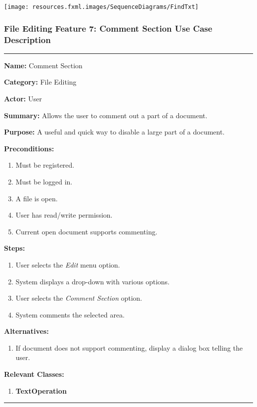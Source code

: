 \documentclass[twoside,letterpaper]{article}
\begin{document}
\bigskip

\texttt{[image: resources.fxml.images/SequenceDiagrams/FindTxt]}

\newpage

\subsubsection[File Editing Feature 7: Comment Section]{\rmfamily\bfseries\color{black}
	File Editing Feature 7: Comment Section Use Case Description}
\hypertarget{RefHeading22059017292}{}

\vspace{2pt}
\hrule
\vspace{8pt}
	\noindent\textbf{Name:} Comment Section \newline
	
	\noindent\textbf{Category:} File Editing \newline
	
	\noindent\textbf{Actor:} User \newline
	
	\noindent\textbf{Summary:} Allows the user to comment out a part of a document. \newline
	
	\noindent\textbf{Purpose:} A useful and quick way to disable a large part of a document. \newline
	
	\noindent\textbf{Preconditions:}
	\begin{enumerate}
		\item Must be registered.
		\item Must be logged in.
		\item A file is open.
		\item User has read/write permission.
		\item Current open document supports commenting.
	\end{enumerate}
	\noindent\textbf{Steps:}
	\begin{enumerate}
		\item User selects the \textit{Edit} menu option.
		\item System displays a drop-down with various options.
		\item User selects the \textit{Comment Section} option.
		\item System comments the selected area.
	\end{enumerate}
	\noindent\textbf{Alternatives:}
	\begin{enumerate}
		\item If document does not support commenting, display a dialog box telling the user.
	\end{enumerate}
	\noindent\textbf{Relevant Classes:}
	\begin{enumerate}
		\item \textbf {TextOperation}
	\end{enumerate}
\vspace{8pt}
\hrule
\newpage
\end{document}
